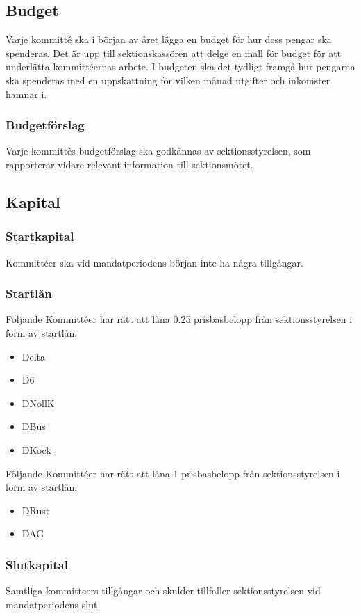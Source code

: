\documentclass[a4paper]{dtek}
\newcommand{\prisbasbelopp}[1]{
    #1 prisbasbelopp
    \ifdef{\nuvarandeprisbasbelopp}{
        \marginpar{
            \small{ \textbf{\roundandprint{\xintiexpr#1 * \nuvarandeprisbasbelopp\relax}kr}}
        }
    }{}
}
\begin{document}
\subsection{Budget}
\label{sec:budget}
Varje kommitté ska i början av året lägga en budget för hur dess pengar ska spenderas. Det är upp till sektionskassören att delge en mall för budget för att underlätta kommittéernas arbete. I budgeten ska det tydligt framgå hur pengarna ska spenderas med en uppskattning för vilken månad utgifter och inkomster hamnar i.

\subsubsection{Budgetförslag}
Varje kommittés budgetförslag ska godkännas av sektionsstyrelsen, som rapporterar vidare relevant information till sektionsmötet.


\subsection{Kapital}
\label{sec:sektionsforeningar_startkapital}
\subsubsection{Startkapital}
Kommittéer ska vid mandatperiodens början inte ha några tillgångar.
\subsubsection{Startlån}
Följande Kommittéer har rätt att låna \prisbasbelopp{0.25} från sektionsstyrelsen i form av startlån:
\begin{itemize}
  \item Delta
  \item D6
  \item DNollK
  \item DBus
  \item DKock
\end{itemize}
Följande Kommittéer har rätt att låna \prisbasbelopp{1} från sektionsstyrelsen i form av startlån:
\begin{itemize}
  \item DRust
  \item DAG
\end{itemize}
\subsubsection{Slutkapital}
Samtliga kommitteers tillgångar och skulder tillfaller sektionsstyrelsen vid mandatperiodens slut.
\end{document}
